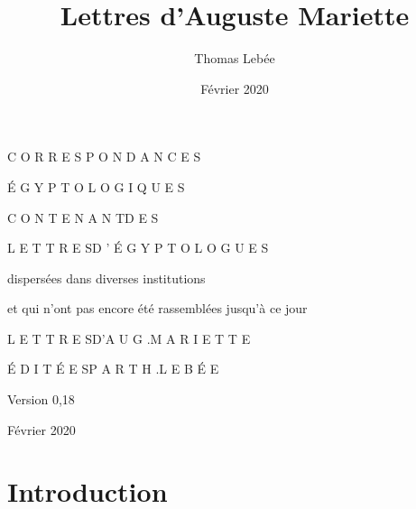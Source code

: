 \documentclass{book}
\title{Lettres d'Auguste Mariette}
\author{Thomas Lebée}
\date{Février 2020}
\begin{document}
\begin{titlepage}
\centering    
\LARGE{C O R R E S P O N D A N C E S}
    
\Huge{É G Y P T O L O G I Q U E S}
\vspace{1\baselineskip}

\large C O N T E N A N T\space\space\space D E S
\vspace{1\baselineskip}

\Large L E T T R E S\space\space\space D ' É G Y P T O L O G U E S
\vspace{2\baselineskip}

\large dispersées dans diverses institutions
\vspace{1\baselineskip}

et qui n'ont pas encore été rassemblées jusqu'à ce jour
\vspace{9\baselineskip}

\LARGE L E T T R E S\space\space\space D\space '\space A U G .\space\space\space M A R I E T T E
\vspace{4\baselineskip}

\normalsize É D I T É E S\space\space\space P A R \space\space\space T H .\space\space\space L E B É E
\vspace{4\baselineskip}

Version 0,18
\vspace{1\baselineskip}

Février 2020
\end{titlepage}

\chapter*{Introduction}
\end{document}
